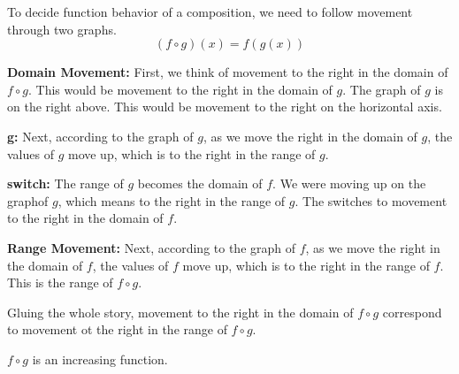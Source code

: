 \documentclass{ximera}
\begin{document}
To decide function behavior of a composition, we need to follow movement through two graphs. \\



\[
(f \circ g)(x) = f(g(x))
\]



\textbf{\textcolor{blue!55!black}{Domain Movement:}}  First, we think of movement to the right in the domain of $f \circ g$.  This would be movement to the right in the domain of $g$.  The graph of $g$ is on the right above.  This would be movement to the right on the horizontal axis.



\textbf{\textcolor{blue!55!black}{g:}}  Next, according to the graph of $g$, as we move the right in the domain of $g$, the values of $g$ move up, which is to the right in the range of $g$.




\textbf{\textcolor{blue!55!black}{switch:}}   The range of $g$ becomes the domain of $f$.  We were moving up on the graphof $g$, which means to the right in the range of $g$.  The switches to movement to the right in the domain of $f$.




\textbf{\textcolor{blue!55!black}{Range Movement:}}  Next, according to the graph of $f$, as we move the right in the domain of $f$, the values of $f$ move up, which is to the right in the range of $f$.  This is the range of $f \circ g$.




Gluing the whole story, movement to the right in the domain of $f \circ g$ correspond to movement ot the right in the range of $f \circ g$.

$f \circ g$ is an increasing function.
\end{document}

